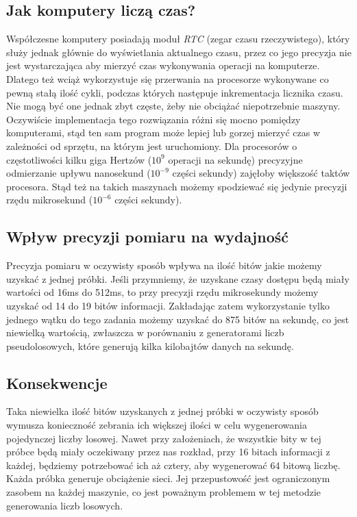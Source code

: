 \subsection{Jak komputery liczą czas?}
Współczesne komputery posiadają moduł \emph{RTC} (zegar czasu rzeczywistego), który służy jednak głównie do wyświetlania aktualnego czasu, przez co jego precyzja nie jest wystarczająca aby mierzyć czas wykonywania operacji na komputerze. Dlatego też wciąż wykorzystuje się przerwania na procesorze wykonywane co pewną stałą ilość cykli, podczas których następuje inkrementacja licznika czasu. Nie mogą być one jednak zbyt częste, żeby nie obciążać niepotrzebnie maszyny. Oczywiście implementacja tego rozwiązania różni się mocno pomiędzy komputerami, stąd ten sam program może lepiej lub gorzej mierzyć czas w zależności od sprzętu, na którym jest uruchomiony. Dla procesorów o częstotliwości kilku giga Hertzów ($10^9$ operacji na sekundę) precyzyjne odmierzanie upływu nanosekund ($10^{-9}$ części sekundy) zajęłoby większość taktów procesora. Stąd też na takich maszynach możemy spodziewać się jedynie precyzji rzędu mikrosekund ($10^{-6}$ części sekundy). 
\subsection{Wpływ precyzji pomiaru na wydajność}
Precyzja pomiaru w oczywisty sposób wpływa na ilość bitów jakie możemy uzyskać z jednej próbki. Jeśli przymniemy, że uzyskane czasy dostępu będą miały wartości od 16ms do 512ms, to przy precyzji rzędu mikrosekundy możemy uzyskać od 14 do 19 bitów informacji. Zakładając zatem wykorzystanie tylko jednego wątku do tego zadania możemy uzyskać do 875 bitów na sekundę, co jest niewielką wartością, zwłaszcza w porównaniu z generatorami liczb pseudolosowych, które generują kilka kilobajtów danych na sekundę.
\subsection{Konsekwencje}
Taka niewielka ilość bitów uzyskanych z jednej próbki w oczywisty sposób wymusza konieczność zebrania ich większej ilości w celu wygenerowania pojedynczej liczby losowej. Nawet przy  założeniach, że wszystkie bity w tej próbce będą miały oczekiwany przez nas rozkład, przy 16 bitach informacji z każdej, będziemy potrzebować ich aż cztery, aby wygenerować 64 bitową liczbę. Każda próbka generuje obciążenie sieci. Jej przepustowość jest ograniczonym zasobem na każdej maszynie, co jest poważnym problemem w tej metodzie generowania liczb losowych.

